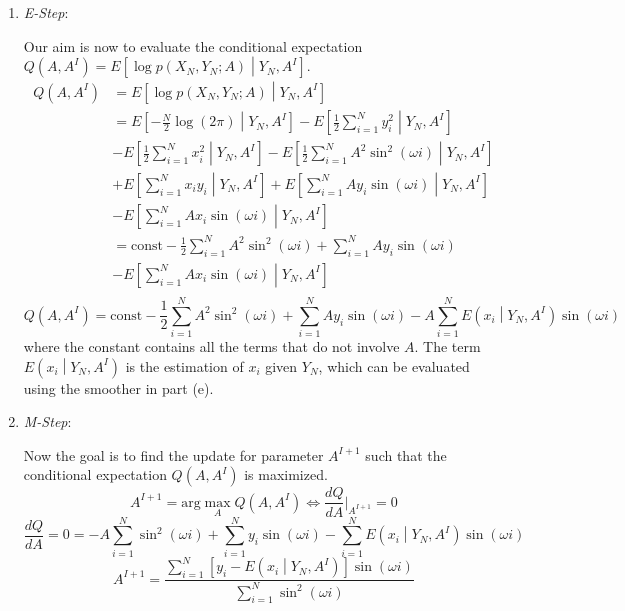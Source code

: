 \documentclass[a4paper, 11pt]{article}
\begin{document}
\begin{enumerate}
\item \textit{E-Step}:

Our aim is now to evaluate the conditional expectation $Q(A, A^I) = E\left[\log p(X_N, Y_N; A) \middle| Y_N, A^I \right]$.
\begin{equation}
\begin{split}
Q(A, A^I) & = E\left[\log p(X_N, Y_N; A) \middle| Y_N, A^I \right]\\
 & = E\left[ -\frac{N}{2}\log(2\pi) \middle|Y_N, A^I \right] - E\left[ \frac{1}{2}\sum_{i=1}^Ny_i^2 \middle|Y_N, A^I \right] \\
 & - E\left[ \frac{1}{2}\sum_{i=1}^Nx_i^2 \middle|Y_N, A^I \right] - E\left[ \frac{1}{2}\sum_{i=1}^N A^2\sin^2(\omega i) \middle|Y_N, A^I \right] \\
 & + E\left[ \sum_{i=1}^N x_iy_i \middle|Y_N, A^I \right] + E\left[ \sum_{i=1}^NAy_i\sin(\omega i) \middle|Y_N, A^I \right] \\
 & - E\left[ \sum_{i=1}^N Ax_i\sin(\omega i) \middle|Y_N, A^I \right] \\
 & = \text{const} - \frac{1}{2}\sum_{i=1}^N A^2\sin^2(\omega i) + \sum_{i=1}^NAy_i\sin(\omega i)\\
 & - E\left[ \sum_{i=1}^N Ax_i\sin(\omega i) \middle|Y_N, A^I \right]\\ 
\end{split}
\end{equation}
\begin{equation}
Q(A, A^I) = \text{const} - \frac{1}{2}\sum_{i=1}^N A^2\sin^2(\omega i) + \sum_{i=1}^NAy_i\sin(\omega i) - A\sum_{i=1}^N E\left(x_i \middle| Y_N, A^I \right)\sin(\omega i)
\end{equation}
where the constant contains all the terms that do not involve $A$. The term $E\left(x_i \middle| Y_N, A^I \right)$ is the estimation of $x_i$ given $Y_N$, which can be evaluated using the smoother in part (e). 

\item \textit{M-Step}:

Now the goal is to find the update for parameter $A^{I+1}$ such that the conditional expectation $Q(A, A^I)$ is maximized. 
\begin{equation}
A^{I+1} = \text{arg}\max_{A} Q(A, A^I) \iff \frac{dQ}{dA}\Bigg|_{A^{I+1}}=0
\end{equation}
\begin{equation}
\frac{dQ}{dA} = 0 = -A\sum_{i=1}^N\sin^2(\omega i) + \sum_{i=1}^Ny_i\sin(\omega i) - \sum_{i=1}^N E\left(x_i\middle| Y_N, A^I \right)\sin(\omega i)
\end{equation}
\begin{equation}
A^{I+1} = \frac{\sum_{i=1}^N\left[ y_i - E\left(x_i\middle| Y_N, A^I \right)\right]\sin(\omega i) }{\sum_{i=1}^N\sin^2(\omega i)}
\end{equation}
\end{enumerate}
\end{document}
